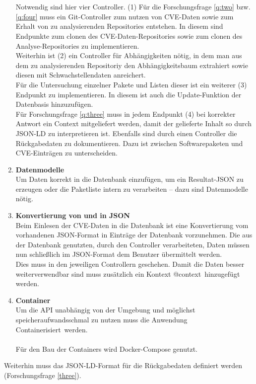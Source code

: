 \begin{enumerate}
            \\ \\
            Notwendig sind hier vier Controller.
            (1) Für die Forschungsfrage \ref{q:two} bzw. \ref{q:four} muss ein Git-Controller zum nutzen von CVE-Daten sowie zum Erhalt von zu analysierenden Repositories entstehen.
            In diesem sind Endpunkte zum clonen des CVE-Daten-Repositories sowie zum clonen des Analyse-Repositories zu implementieren. %
            \\
            Weiterhin ist (2) ein Controller für Abhängigkeiten nötig, in dem man aus dem zu analysierenden Repositoriy den Abhängigkeitsbaum extrahiert sowie diesen mit Schwachstellendaten anreichert.
            \\
            Für die Untersuchung einzelner Pakete und Listen dieser ist ein weiterer (3) Endpunkt zu implementieren.
            In diesem ist auch die Update-Funktion der Datenbasis hinzuzufügen.
            \\
            Für Forschungsfrage \ref{q:three} muss in jedem Endpunkt (4) bei korrekter Antwort ein Context mitgeliefert werden, damit der gelieferte Inhalt so durch JSON-LD zu interpretieren ist.
            Ebenfalls sind durch einen Controller die Rückgabedaten zu dokumentieren.
            Dazu ist zwischen Softwarepaketen und CVE-Einträgen zu unterscheiden.
        \item \textbf{Datenmodelle} \label{arch_4}\\
            Um Daten korrekt in die Datenbank einzufügen, um ein Resultat-JSON zu erzeugen oder die Paketliste intern zu verarbeiten -- dazu sind Datenmodelle nötig.
        \item \textbf{Konvertierung von und in JSON} \label{arch_5}\\
            Beim Einlesen der CVE-Daten in die Datenbank ist eine Konvertierung vom vorhandenen JSON-Format in Einträge der Datenbank vorzunehmen.
            Die aus der Datenbank genutzten, durch den Controller verarbeiteten, Daten müssen nun schließlich im JSON-Format dem Benutzer übermittelt werden.
            \\
            Dies muss in den jeweiligen Controllern geschehen.
            Damit die Daten besser weiterverwendbar sind muss zusätzlich ein Kontext \glqq @context\grqq~hinzugefügt werden.
        \item \textbf{Container} \\
            Um die API unabhängig von der Umgebung und möglichst speicheraufwandsschmal zu nutzen muss die Anwendung \glqq Containerisiert\grqq~werden.
            \\ \\
            Für den Bau der Containers wird Docker-Compose genutzt.
    \end{enumerate}
    Weiterhin muss das JSON-LD-Format für die Rückgabedaten definiert werden (Forschungsfrage \ref{three}).
